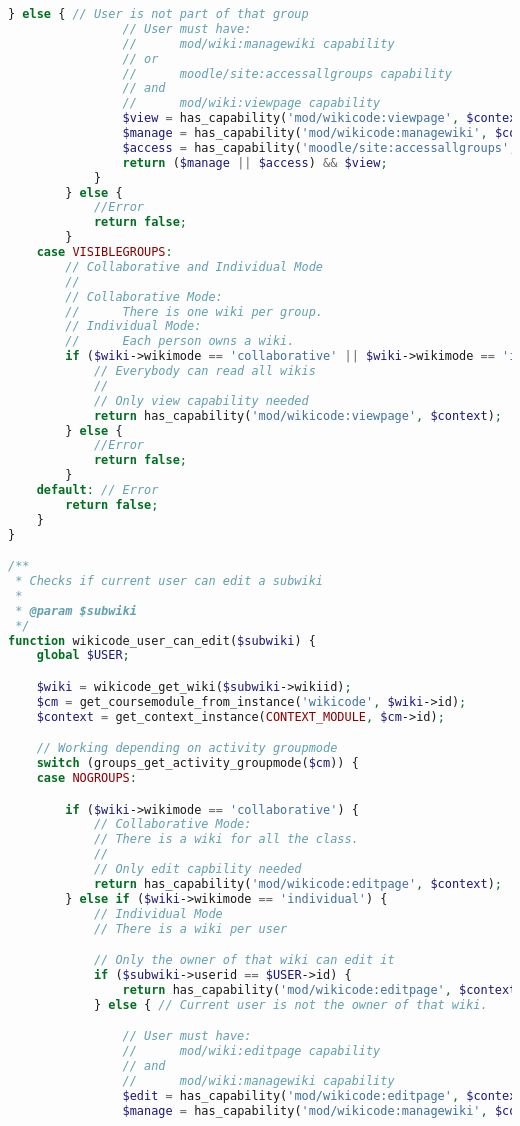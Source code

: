 \begin{lstlisting}[language=PHP]
            } else { // User is not part of that group
                // User must have:
                //      mod/wiki:managewiki capability
                // or
                //      moodle/site:accessallgroups capability
                // and
                //      mod/wiki:viewpage capability
                $view = has_capability('mod/wikicode:viewpage', $context);
                $manage = has_capability('mod/wikicode:managewiki', $context);
                $access = has_capability('moodle/site:accessallgroups', $context);
                return ($manage || $access) && $view;
            }
        } else {
            //Error
            return false;
        }
    case VISIBLEGROUPS:
        // Collaborative and Individual Mode
        //
        // Collaborative Mode:
        //      There is one wiki per group.
        // Individual Mode:
        //      Each person owns a wiki.
        if ($wiki->wikimode == 'collaborative' || $wiki->wikimode == 'individual') {
            // Everybody can read all wikis
            //
            // Only view capability needed
            return has_capability('mod/wikicode:viewpage', $context);
        } else {
            //Error
            return false;
        }
    default: // Error
        return false;
    }
}

/**
 * Checks if current user can edit a subwiki
 *
 * @param $subwiki
 */
function wikicode_user_can_edit($subwiki) {
    global $USER;

    $wiki = wikicode_get_wiki($subwiki->wikiid);
    $cm = get_coursemodule_from_instance('wikicode', $wiki->id);
    $context = get_context_instance(CONTEXT_MODULE, $cm->id);

    // Working depending on activity groupmode
    switch (groups_get_activity_groupmode($cm)) {
    case NOGROUPS:

        if ($wiki->wikimode == 'collaborative') {
            // Collaborative Mode:
            // There is a wiki for all the class.
            //
            // Only edit capbility needed
            return has_capability('mod/wikicode:editpage', $context);
        } else if ($wiki->wikimode == 'individual') {
            // Individual Mode
            // There is a wiki per user

            // Only the owner of that wiki can edit it
            if ($subwiki->userid == $USER->id) {
                return has_capability('mod/wikicode:editpage', $context);
            } else { // Current user is not the owner of that wiki.

                // User must have:
                //      mod/wiki:editpage capability
                // and
                //      mod/wiki:managewiki capability
                $edit = has_capability('mod/wikicode:editpage', $context);
                $manage = has_capability('mod/wikicode:managewiki', $context);


\end{lstlisting}
